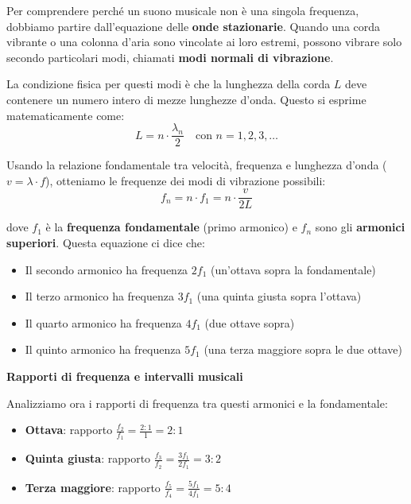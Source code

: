 \begin{fisica}
	\label{phys:serie_armonici_fondamento}
	
	Per comprendere perché un suono musicale non è una singola frequenza, dobbiamo partire dall'equazione delle \textbf{onde stazionarie}. Quando una corda vibrante o una colonna d'aria sono vincolate ai loro estremi, possono vibrare solo secondo particolari modi, chiamati \textbf{modi normali di vibrazione}.
	
	La condizione fisica per questi modi è che la lunghezza della corda $L$ deve contenere un numero intero di mezze lunghezze d'onda. Questo si esprime matematicamente come:
	\[
	L = n \cdot \frac{\lambda_n}{2} \quad \text{con } n = 1, 2, 3, \ldots
	\]
	
	Usando la relazione fondamentale tra velocità, frequenza e lunghezza d'onda ($v = \lambda \cdot f$), otteniamo le frequenze dei modi di vibrazione possibili:
	\[
	f_n = n \cdot f_1 = n \cdot \frac{v}{2L}
	\]
	
	dove $f_1$ è la \textbf{frequenza fondamentale} (primo armonico) e $f_n$ sono gli \textbf{armonici superiori}. Questa equazione ci dice che:
	\begin{itemize}
		\item Il secondo armonico ha frequenza $2f_1$ (un'ottava sopra la fondamentale)
		\item Il terzo armonico ha frequenza $3f_1$ (una quinta giusta sopra l'ottava)
		\item Il quarto armonico ha frequenza $4f_1$ (due ottave sopra)
		\item Il quinto armonico ha frequenza $5f_1$ (una terza maggiore sopra le due ottave)
	\end{itemize}
	
	\textbf{Rapporti di frequenza e intervalli musicali}
	
	Analizziamo ora i rapporti di frequenza tra questi armonici e la fondamentale:
	\begin{itemize}
		\item \textbf{Ottava}: rapporto $\frac{f_2}{f_1} = \frac{2:1}{1} = 2:1$
		\item \textbf{Quinta giusta}: rapporto $\frac{f_3}{f_2} = \frac{3f_1}{2f_1} = 3:2$
		\item \textbf{Terza maggiore}: rapporto $\frac{f_5}{f_4} = \frac{5f_1}{4f_1} = 5:4$
	\end{itemize}
	

\end{fisica}
